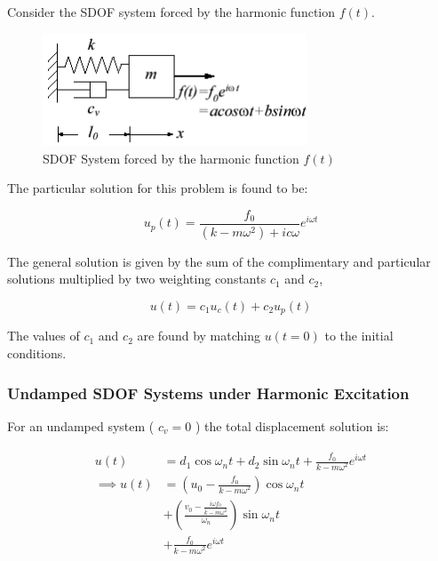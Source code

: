 \documentclass[10pt,b5paper,titlepage]{book}
\newenvironment{eqarray}
{
    \begin{eqnarray}
        \begin{aligned}
}
{
        \end{aligned}
    \end{eqnarray}
}
\begin{document}
Consider the SDOF system forced by the harmonic function $ f(t) $.

\begin{figure}[ht]
    \centering
    \includegraphics[width=0.70\textwidth]{img/SDOF_harmonic.png}
    \caption{SDOF System forced by the harmonic function $ f(t) $}
    \label{fig:SDOF-harmonic-response-png}
\end{figure}

The particular solution for this problem is found to be:

\begin{equation}
    u_p(t) = \frac{f_0}{ \left( k - m \omega^2 \right) + i c \omega} e^{i \omega t}
\end{equation}

The general solution is given by the sum of the complimentary and particular
solutions multiplied by two weighting constants $ c_1 $ and $ c_2 $,

\begin{equation}
    u(t) = c_1 u_c(t) + c_2 u_p(t)
\end{equation}

The values of $ c_1 $ and $ c_2 $ are found by matching $ u(t=0) $ to the
initial conditions.

\subsubsection{Undamped SDOF Systems under Harmonic Excitation}

For an undamped system ( $ c_v = 0 $ ) the total displacement solution is:

\begin{eqarray}
    u(t) &= d_1 \cos{\omega_n t} + d_2 \sin{\omega_n t} +
    \frac{f_0}{k - m \omega^2} e^{i \omega t}\\
    \implies u(t) &= \left( u_0 - \frac{f_0}{k - m \omega^2} \right) \cos{\omega_n t}\\
                  &+
    \left(\frac{v_0 - \frac{i \omega f_0}{k - m \omega^2}}{\omega_n} \right)
    \sin{\omega_n t}\\
                  &+ \frac{f_0}{k - m \omega^2} e^{i \omega t}
\end{eqarray}
\end{document}
